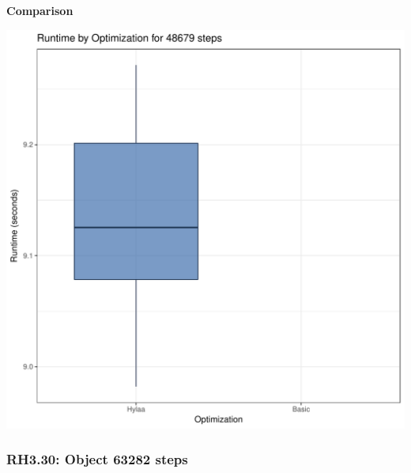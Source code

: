 \documentclass{article}\usepackage[]{graphicx}\usepackage[]{color}
\makeatletter
\def\maxwidth{ %
  \ifdim\Gin@nat@width>\linewidth
    \linewidth
  \else
    \Gin@nat@width
  \fi
}
\newenvironment{knitrout}{}{} %
\makeatother
\begin{document}
 \textbf{Comparison}
  
\begin{knitrout}
\color{fgcolor}
\includegraphics[width=\maxwidth]{figure/RH3_steps48679-1} 

\end{knitrout}


\subsubsection{RH3.30: Object 63282 steps}
\end{document}
